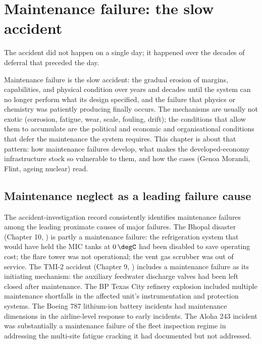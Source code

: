 \chapter{Maintenance failure: the slow accident}
\label{vol10:ch14}

\epigraph{The accident did not happen on a single day; it happened over the decades of deferral that preceded the day.}{}


\noindent
Maintenance failure is the slow accident: the gradual erosion of margins, capabilities, and physical condition over years and decades until the system can no longer perform what its design specified, and the failure that physics or chemistry was patiently producing finally occurs. The mechanisms are usually not exotic (corrosion, fatigue, wear, scale, fouling, drift); the conditions that allow them to accumulate are the political and economic and organisational conditions that defer the maintenance the system requires. This chapter is about that pattern: how maintenance failures develop, what makes the developed-economy infrastructure stock so vulnerable to them, and how the cases (Genoa Morandi, Flint, ageing nuclear) read.

\section{Maintenance neglect as a leading failure cause}

The accident-investigation record consistently identifies maintenance failures among the leading proximate causes of major failures. The Bhopal disaster (Chapter 10, \cite{acc:icmr-bhopal-2004}) is partly a maintenance failure: the refrigeration system that would have held the MIC tanks at $0\,\degC$ had been disabled to save operating cost; the flare tower was not operational; the vent gas scrubber was out of service. The TMI-2 accident (Chapter 9, \cite{acc:kemeny-tmi-1979}) includes a maintenance failure as its initiating mechanism: the auxiliary feedwater discharge valves had been left closed after maintenance. The BP Texas City refinery explosion \cite{acc:csb-bp-texas-city-2007} included multiple maintenance shortfalls in the affected unit's instrumentation and protection systems. The Boeing 787 lithium-ion battery incidents \cite{acc:ntsb-aar14-01-787-battery} had maintenance dimensions in the airline-level response to early incidents. The Aloha 243 incident \cite{acc:ntsb-aar94-04} was substantially a maintenance failure of the fleet inspection regime in addressing the multi-site fatigue cracking it had documented but not addressed.

